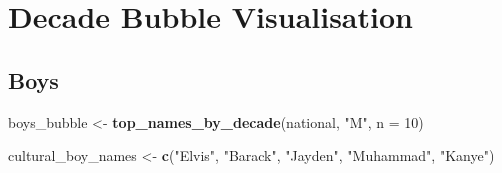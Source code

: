 \documentclass[
]{article}
\newenvironment{Shaded}{\begin{snugshade}}{\end{snugshade}}
\newcommand{\AttributeTok}[1]{\textcolor[rgb]{0.13,0.29,0.53}{#1}}
\newcommand{\DecValTok}[1]{\textcolor[rgb]{0.00,0.00,0.81}{#1}}
\newcommand{\FunctionTok}[1]{\textcolor[rgb]{0.13,0.29,0.53}{\textbf{#1}}}
\newcommand{\NormalTok}[1]{#1}
\newcommand{\OtherTok}[1]{\textcolor[rgb]{0.56,0.35,0.01}{#1}}
\newcommand{\StringTok}[1]{\textcolor[rgb]{0.31,0.60,0.02}{#1}}
\begin{document}
\newpage

\section{Decade Bubble Visualisation}\label{decade-bubble-visualisation}

\subsection{Boys}\label{boys}

\begin{Shaded}
\begin{Highlighting}[]
\NormalTok{boys\_bubble }\OtherTok{\textless{}{-}} \FunctionTok{top\_names\_by\_decade}\NormalTok{(national, }\StringTok{"M"}\NormalTok{, }\AttributeTok{n =} \DecValTok{10}\NormalTok{)}

\NormalTok{cultural\_boy\_names }\OtherTok{\textless{}{-}} \FunctionTok{c}\NormalTok{(}\StringTok{"Elvis"}\NormalTok{, }\StringTok{"Barack"}\NormalTok{, }\StringTok{"Jayden"}\NormalTok{, }\StringTok{"Muhammad"}\NormalTok{, }\StringTok{"Kanye"}\NormalTok{)}


\end{Highlighting}
\end{Shaded}
\end{document}
